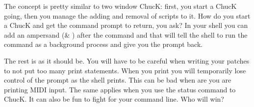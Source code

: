 The concept is pretty similar to two window ChucK: first, you start a ChucK going, then you manage the adding and removal of scripts to it. How do you start a ChucK and get the command prompt to return, you ask? In your shell you can add an ampersand (\& ) after the command and that will tell the shell to run the command as a background process and give you the prompt back. 


The rest is as it should be. You will have to be careful when writing your patches to not put too many print statements. When you print you will temporarily lose control of the prompt as the shell prints. This can be bad when are you are printing MIDI input. The same applies when you use the \doubledash status command to ChucK. It can also be fun to fight for your command line. Who will win?
